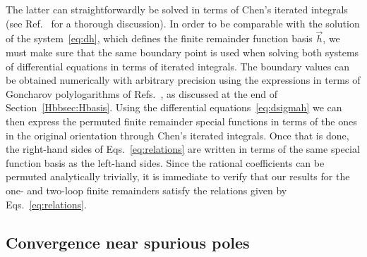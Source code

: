 \documentclass[main.tex]{subfiles}
\begin{document}
The latter can straightforwardly be solved in terms of Chen's iterated integrals (see Ref.~\cite{Badger:2021nhg} for a thorough discussion). In order to be comparable with the solution of the system~\eqref{eq:dh}, which defines the finite remainder function basis $\vec{h}$, we must make sure that the same boundary point is used when solving both systems of differential equations in terms of iterated integrals. The boundary values can be obtained numerically with arbitrary precision using the expressions in terms of Goncharov polylogarithms of Refs.~\cite{Papadopoulos:2015jft,Syrrakos:2020kba,Canko:2020ylt}, as discussed at the end of Section~\ref{Hbbsec:Hbasis}. Using the differential equations~\eqref{eq:dsigmah} we can then express the permuted finite remainder special functions in terms of the ones in the original orientation through Chen's iterated integrals. Once that is done, the right-hand sides of Eqs.~\eqref{eq:relations} are written in terms of the same special function basis as the left-hand sides. Since the rational coefficients can be permuted analytically trivially, it is immediate to verify that our results for the one- and two-loop finite remainders satisfy the relations given by Eqs.~\eqref{eq:relations}.




\subsection{Convergence near spurious poles}
\end{document}
